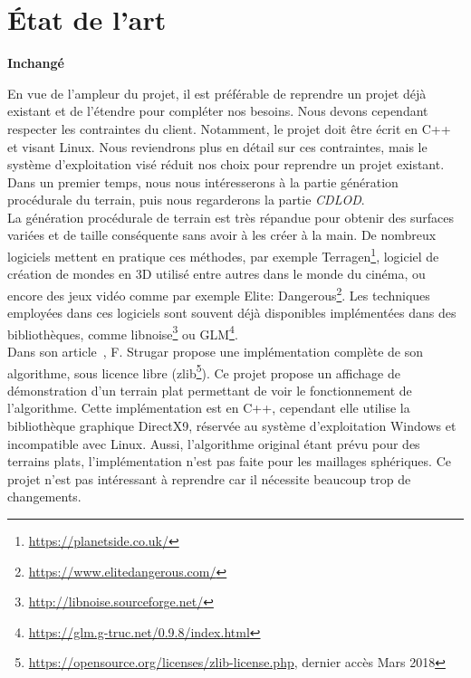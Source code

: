\chapter*{État de l'art}
\setcounter{chapter}{0}

\textbf{Inchangé}

En vue de l'ampleur du projet, il est préférable de reprendre un projet
déjà existant et de l'étendre pour compléter nos besoins. Nous devons
cependant respecter les contraintes du client. Notamment, le projet doit
être écrit en C++ et visant Linux. Nous reviendrons plus en
détail sur ces contraintes, mais le système d'exploitation visé réduit
nos choix pour reprendre un projet existant. Dans un premier temps, nous
nous intéresserons à la partie génération procédurale du terrain, puis
nous regarderons la partie \emph{CDLOD}.\\

La génération procédurale de terrain est très répandue pour obtenir des
surfaces variées et de taille conséquente sans avoir à les créer à la
main. De nombreux logiciels mettent en pratique ces méthodes, par
exemple Terragen\footnote{\url{https://planetside.co.uk/}}, logiciel de
création de mondes en 3D utilisé entre autres dans le monde du cinéma,
ou encore des jeux vidéo comme par exemple Elite:
Dangerous\footnote{\url{https://www.elitedangerous.com/}}. Les
techniques employées dans ces logiciels sont souvent déjà disponibles
implémentées dans des bibliothèques, comme
libnoise\footnote{\url{http://libnoise.sourceforge.net/}} ou
GLM\footnote{\url{https://glm.g-truc.net/0.9.8/index.html}}.\\

Dans son article~\cite{CDLOD}, F. Strugar propose une implémentation
complète de son algorithme, sous licence libre
(zlib\footnote{\url{https://opensource.org/licenses/zlib-license.php}, dernier accès Mars 2018}).
Ce projet propose un affichage de démonstration d'un terrain plat
permettant de voir le fonctionnement de l'algorithme. Cette
implémentation est en C++, cependant elle utilise la bibliothèque
graphique DirectX9, réservée au système d'exploitation Windows et
incompatible avec Linux. Aussi, l'algorithme original étant prévu pour
des terrains plats, l'implémentation n'est pas faite pour les maillages
sphériques. Ce projet n'est pas intéressant à reprendre car il nécessite
beaucoup trop de changements.

